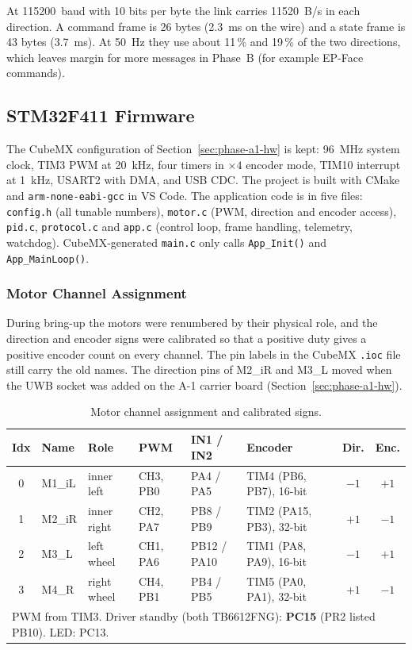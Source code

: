 \documentclass[12pt,a4paper]{article}
\begin{document}
At \SI{115200}{baud} with 10 bits per byte the link carries \SI{11520}{B/s} in each direction.
A command frame is 26 bytes (\SI{2.3}{ms} on the wire) and a state frame is 43 bytes
(\SI{3.7}{ms}). At \SI{50}{Hz} they use about 11\,\% and 19\,\% of the two directions,
which leaves margin for more messages in Phase~B (for example EP-Face commands).

\subsection{STM32F411 Firmware}
\label{pr3:sec:stm}

The CubeMX configuration of Section~\ref{sec:phase-a1-hw} is kept: \SI{96}{MHz} system clock,
TIM3 PWM at \SI{20}{kHz}, four timers in $\times4$ encoder mode, TIM10 interrupt at
\SI{1}{kHz}, USART2 with DMA, and USB CDC. The project is built with CMake and
\texttt{arm-none-eabi-gcc} in VS Code. The application code is in five files:
\texttt{config.h} (all tunable numbers), \texttt{motor.c} (PWM, direction and encoder
access), \texttt{pid.c}, \texttt{protocol.c} and \texttt{app.c} (control loop, frame handling,
telemetry, watchdog). CubeMX-generated \texttt{main.c} only calls \texttt{App\_Init()} and
\texttt{App\_MainLoop()}.

\subsubsection{Motor Channel Assignment}

During bring-up the motors were renumbered by their physical role, and the direction and
encoder signs were calibrated so that a positive duty gives a positive encoder count on
every channel. The pin labels
in the CubeMX \texttt{.ioc} file still carry the old names. The direction pins of M2\_iR and M3\_L moved when the UWB socket was added on the A-1 carrier board (Section~\ref{sec:phase-a1-hw}).

\begin{table}[H]
\centering
\caption{Motor channel assignment and calibrated signs.}
\label{pr3:tab:pins}
\footnotesize
\begin{tabular}{c l l l l l c c}
\toprule
Idx & Name & Role & PWM & IN1 / IN2 & Encoder & Dir. & Enc. \\
\midrule
0 & M1\_iL & inner left  & CH3, PB0 & PA4 / PA5   & TIM4 (PB6, PB7), 16-bit  & $-1$ & $+1$ \\
1 & M2\_iR & inner right & CH2, PA7 & PB8 / PB9 & TIM2 (PA15, PB3), 32-bit & $+1$ & $-1$ \\
2 & M3\_L  & left wheel       & CH1, PA6 & PB12 / PA10 & TIM1 (PA8, PA9), 16-bit  & $-1$ & $+1$ \\
3 & M4\_R  & right wheel      & CH4, PB1 & PB4 / PB5   & TIM5 (PA0, PA1), 32-bit  & $+1$ & $-1$ \\
\midrule
\multicolumn{8}{l}{PWM from TIM3. Driver standby (both TB6612FNG): \textbf{PC15} (PR2 listed PB10). LED: PC13.} \\
\bottomrule
\end{tabular}
\end{table}
\end{document}
